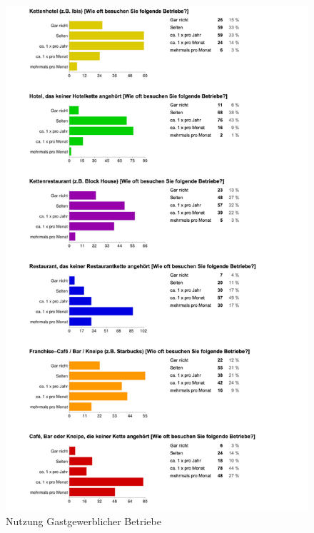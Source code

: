 \begin{figure}[H]
\begin{center}
\includegraphics[width=.9\textwidth]{u02.jpg}
\caption{Nutzung Gastgewerblicher Betriebe}
\label{pic:aus2}
\end{center}
\end{figure}


